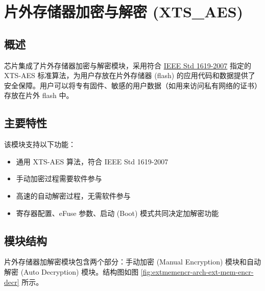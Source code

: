\documentclass[main\_\_CN.tex]{subfiles}
\begin{document}

\ifglobal
\else
    {\let\clearpage\relax \listoftodos}
    {\let\clearpage\relax \listofdonetodos}
    \tableofcontents
\fi



\hypertarget{extmemencr}{}
\chapter{片外存储器加密与解密 (XTS\_AES)}
\label{mod:extmemencr}

\section{概述}

\chipname{} 芯片集成了片外存储器加密与解密模块，采用符合 \href{https://ieeexplore.ieee.org/document/4493450}{IEEE Std 1619-2007} 指定的 XTS-AES 标准算法，为用户存放在片外存储器 (flash) 的应用代码和数据提供了安全保障。用户可以将专有固件、敏感的用户数据（如用来访问私有网络的证书）存放在片外 flash 中。


\section{主要特性}

该模块支持以下功能：

\begin{itemize}
    \item 通用 XTS-AES 算法，符合 IEEE Std 1619-2007
    \item 手动加密过程需要软件参与
    \item 高速的自动解密过程，无需软件参与
    \item 寄存器配置、eFuse 参数、启动 (Boot) 模式共同决定加解密功能
\end{itemize}


\section{模块结构}
片外存储器加解密模块包含两个部分：手动加密 (Manual Encryption) 模块和自动解密 (Auto Decryption) 模块。结构图如图 \ref{fig:extmemencr-arch-ext-mem-encr-decr} 所示。
\end{document}
